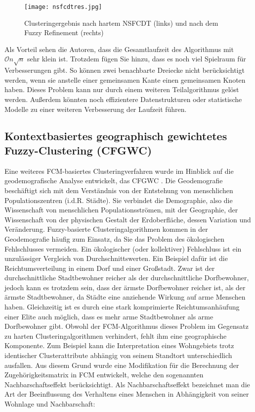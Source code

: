 \documentclass[11pt,ceqn]{book}
\begin{document}
\begin{figure}[H]
\centering
\texttt{[image: nsfcdtres.jpg]}
\caption{Clusteringergebnis nach hartem NSFCDT (links) und nach dem Fuzzy Refinement (rechts)}
\end{figure}


Als Vorteil sehen die Autoren, dass die Gesamtlaufzeit des Algorithmus mit $\mathcal{O}n\sqrt{n}$ sehr klein ist. Trotzdem fügen Sie hinzu, dass es noch viel Spielraum für Verbesserungen gibt. So können zwei benachbarte Dreiecke nicht berücksichtigt werden, wenn sie anstelle einer gemeinsamen Kante einen gemeinsamen Knoten haben. Dieses Problem kann nur durch einem weiteren Teilalgorithmus gelöst werden. Außerdem könnten noch effizientere Datenstrukturen oder statistische Modelle zu einer weiteren Verbesserung der Laufzeit führen.
 
\clearpage

\subsection{Kontextbasiertes geographisch gewichtetes Fuzzy-Clustering (CFGWC)}
Eine weiteres FCM-basiertes Clusteringverfahren wurde im Hinblick auf die geodemografische Analyse entwickelt, das CFGWC \cite{cfgwc}. Die Geodemografie beschäftigt sich mit dem Verständnis von der Entstehung von menschlichen Populationszentren (i.d.R. Städte). Sie verbindet die Demographie, also die Wissenschaft von menschlichen Populationsströmen, mit der Geographie, der Wissenschaft von der physischen Gestalt der Erdoberfläche, dessen Variation und Veränderung. Fuzzy-basierte Clusteringalgorithmen kommen in der Geodemografie häufig zum Einsatz, da Sie das Problem des ökologischen Fehlschlusses vermeiden. Ein ökologischer (oder kollektiver) Fehlschluss ist ein unzulässiger Vergleich von Durchschnittswerten.
Ein Beispiel dafür ist die Reichtumsverteilung in einem Dorf und einer Großstadt. Zwar ist der durchschnittliche Stadtbewohner reicher als der durchschnittliche Dorfbewohner, jedoch kann es trotzdem sein, dass der ärmste Dorfbewohner reicher ist, als der ärmste Stadtbewohner, da Städte eine anziehende Wirkung auf arme Menschen haben. Gleichzeitig ist es durch eine stark komprimierte Reichtumsanhäufung einer Elite auch möglich, dass es mehr arme Stadtbewohner als arme Dorfbewohner gibt.
Obwohl der FCM-Algorithmus dieses Problem im Gegensatz zu harten Clusteringalgorithmen verhindert, fehlt ihm eine geographische Komponente. Zum Beispiel kann die Interpretation eines Wohngebiets trotz identischer Clusterattribute abhängig von seinem Standtort unterschiedlich ausfallen. Aus diesem Grund wurde eine Modifikation für die Berechnung der Zugehörigkeitsmatrix in FCM entwickelt, welche den sogenannten Nachbarschaftseffekt berücksichtigt. Als Nachbarschaftseffekt bezeichnet man die Art der Beeinflussung des Verhaltens eines Menschen in Abhängigkeit von seiner Wohnlage und Nachbarschaft:
\end{document}
